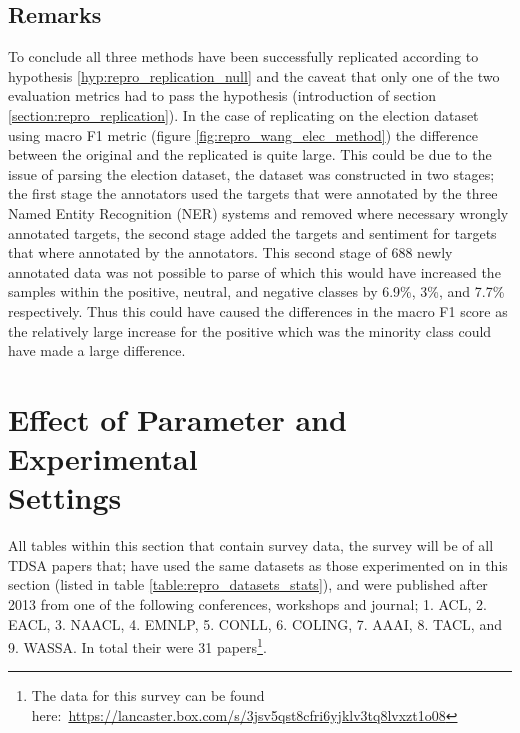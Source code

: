 \subsection{Remarks}
To conclude all three methods have been successfully replicated according to hypothesis \ref{hyp:repro_replication_null} and the caveat that only one of the two evaluation metrics had to pass the hypothesis (introduction of section \ref{section:repro_replication}). In the case of replicating \citet{wang-etal-2017-tdparse} on the election dataset using macro F1 metric (figure \ref{fig:repro_wang_elec_method}) the difference between the original and the replicated is quite large. This could be due to the issue of parsing the election dataset, the dataset was constructed in two stages; the first stage the annotators used the targets that were annotated by the three Named Entity Recognition (NER) systems and removed where necessary wrongly annotated targets, the second stage added the targets and sentiment for targets that where annotated by the annotators. This second stage of 688 newly annotated data was not possible to parse of which this would have increased the samples within the positive, neutral, and negative classes by 6.9\%, 3\%, and 7.7\% respectively. Thus this could have caused the differences in the macro F1 score as the relatively large increase for the positive which was the minority class could have made a large difference.



\section{Effect of Parameter and Experimental \\Settings}
\label{section:repro_effect_param_settings}
All tables within this section that contain survey data, the survey will be of all TDSA papers that; have used the same datasets as those experimented on in this section (listed in table \ref{table:repro_datasets_stats}), and were published after 2013 from one of the following conferences, workshops and journal; 1. ACL, 2. EACL, 3. NAACL, 4. EMNLP, 5. CONLL, 6. COLING, 7. AAAI, 8. TACL, and 9. WASSA. In total their were 31 papers\footnote{The data for this survey can be found here:~\url{https://lancaster.box.com/s/3jsv5qst8cfri6yjklv3tq8lvxzt1o08}}.\\

